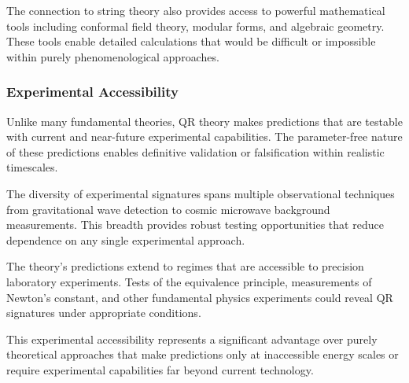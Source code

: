 The connection to string theory also provides access to powerful mathematical tools including conformal field theory, modular forms, and algebraic geometry. These tools enable detailed calculations that would be difficult or impossible within purely phenomenological approaches.

\subsubsection{Experimental Accessibility}
\label{subsubsec:experimental-accessibility}

Unlike many fundamental theories, QR theory makes predictions that are testable with current and near-future experimental capabilities. The parameter-free nature of these predictions enables definitive validation or falsification within realistic timescales.

The diversity of experimental signatures spans multiple observational techniques from gravitational wave detection to cosmic microwave background measurements. This breadth provides robust testing opportunities that reduce dependence on any single experimental approach.

The theory’s predictions extend to regimes that are accessible to precision laboratory experiments. Tests of the equivalence principle, measurements of Newton’s constant, and other fundamental physics experiments could reveal QR signatures under appropriate conditions.

This experimental accessibility represents a significant advantage over purely theoretical approaches that make predictions only at inaccessible energy scales or require experimental capabilities far beyond current technology.